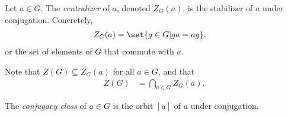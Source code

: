 \documentclass[10pt]{mypackage}
\begin{document}
\begin{definition}
  Let $a\in G$. The \textit{centralizer} of $a$, denoted $Z_G(a)$, is the stabilizer of $a$ under conjugation. Concretely,
  \begin{align*}
    Z_G(a) &= \set{g\in G | ga = ag},
  \end{align*}
  or the set of elements of $G$ that commute with $a$.\newline

  Note that $Z(G)\subseteq Z_G(a)$ for all $a\in G$, and that
  \begin{align*}
    Z(G) &= \bigcap_{a\in G} Z_G(a).
  \end{align*}
\end{definition}
\begin{definition}
  The \textit{conjugacy class} of $a\in G$ is the orbit $\left[ a \right]$ of $a$ under conjugation.
\end{definition}
\end{document}
